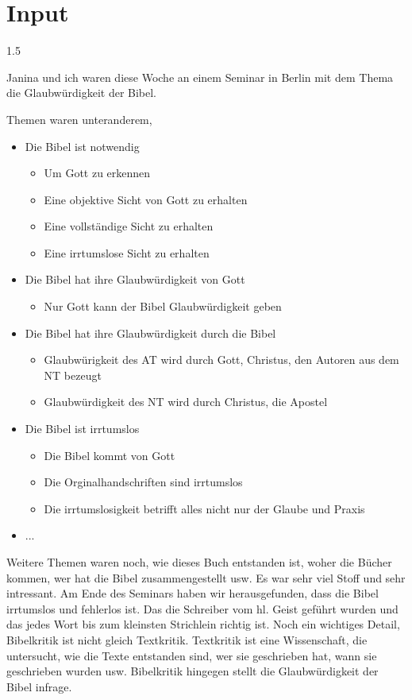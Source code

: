 \documentclass[fontsize=14pt]{../../inc/mybib}
\begin{document}
\section{ Input }
\begin{spacing}{1.5}
    \begin{block}[Einführung]
    Janina und ich waren diese Woche an einem Seminar in Berlin mit dem Thema die Glaubwürdigkeit der Bibel.
    
    Themen waren unteranderem, 
    \begin{itemize}
        \item Die Bibel ist notwendig
        \begin{itemize}
            \item Um Gott zu erkennen
            \item Eine objektive Sicht von Gott zu erhalten
            \item Eine vollständige Sicht zu erhalten
            \item Eine irrtumslose Sicht zu erhalten
        \end{itemize}
        \item Die Bibel hat ihre Glaubwürdigkeit von Gott
        \begin{itemize}
            \item Nur Gott kann der Bibel Glaubwürdigkeit geben 
        \end{itemize}
        \item Die Bibel hat ihre Glaubwürdigkeit durch die Bibel
        \begin{itemize}
            \item Glaubwürigkeit des AT wird durch Gott, Christus, den Autoren aus dem NT bezeugt
            \item Glaubwürdigkeit des NT wird durch Christus, die Apostel 
        \end{itemize}
        \item Die Bibel ist irrtumslos 
        \begin{itemize}
            \item Die Bibel kommt von Gott
            \item Die Orginalhandschriften sind irrtumslos
            \item Die irrtumslosigkeit betrifft alles nicht nur der Glaube und Praxis
        \end{itemize}
        \item ...
    \end{itemize}
    Weitere Themen waren noch, wie dieses Buch entstanden ist, woher die Bücher kommen, wer hat die Bibel zusammengestellt usw. Es war sehr viel Stoff und sehr intressant.
    Am Ende des Seminars haben wir herausgefunden, dass die Bibel irrtumslos und fehlerlos ist. Das die Schreiber vom hl. Geist geführt wurden und das jedes Wort bis zum kleinsten Strichlein richtig ist. 
    Noch ein wichtiges Detail, Bibelkritik ist nicht gleich Textkritik. Textkritik ist eine Wissenschaft, die untersucht, wie die Texte entstanden sind, wer sie geschrieben hat, wann sie geschrieben wurden usw. Bibelkritik hingegen stellt die Glaubwürdigkeit der Bibel infrage.


\end{block}
\end{spacing}
\end{document}
